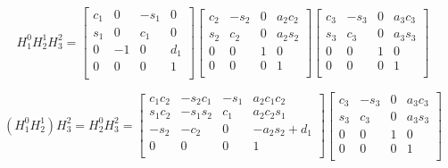 \documentclass[12pt,norsk,a4paper]{article}
\begin{document}
    \[H_1^0H_2^1H_3^2 = 
            \left[ \begin{array}{cccc}
                c_1 & 0 & -s_1 & 0 \\
                s_1 & 0 & c_1 & 0 \\
                0 & -1 & 0 & d_1 \\
                0 & 0 & 0 & 1 \\
            \end{array} \right]
            \left[ \begin{array}{cccc}
                c_2 & -s_2 & 0 & a_2c_2 \\
                s_2 & c_2 & 0 & a_2s_2 \\
                0 & 0 & 1 & 0 \\
                0 & 0 & 0 & 1 \\
            \end{array} \right]
            \left[ \begin{array}{cccc}
                c_3 & -s_3 & 0 & a_3c_3 \\
                s_3 & c_3 & 0 & a_3s_3 \\
                0 & 0 & 1 & 0 \\
                0 & 0 & 0 & 1 \\
            \end{array} \right]\]
        

        \[(H_1^0H_2^1)H_3^2 = H_2^0H_3^2 =
        \left[ \begin{array}{cccc}
            c_1c_2 & -s_2c_1 & -s_1 & a_2c_1c_2 \\
            s_1c_2 & -s_1s_2 & c_1 & a_2c_2s_1 \\
            -s_2 & -c_2 & 0 & -a_2s_2+d_1 \\
            0 & 0 & 0 & 1 \\
        \end{array} \right]
        \left[ \begin{array}{cccc}
            c_3 & -s_3 & 0 & a_3c_3 \\
            s_3 & c_3 & 0 & a_3s_3 \\
            0 & 0 & 1 & 0 \\
            0 & 0 & 0 & 1 \\
        \end{array} \right]\]
\end{document}
